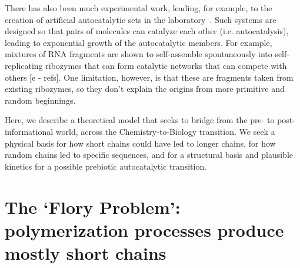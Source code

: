 \documentclass[5p,times]{elsarticle}
\begin{document}
 There has also been much experimental work, leading, for example, to the creation of artificial 
autocatalytic sets in the laboratory~\cite{VonKiedrowski1986,Lincoln2009,Vaidya2012}. Such systems 
are designed so that pairs of molecules can catalyze each other (i.e. autocatalysis), leading to 
exponential growth of the autocatalytic members.  For example, mixtures of RNA fragments are shown 
to self-assemble spontaneously into self-replicating ribozymes that can form catalytic networks 
that can compete with others [e - refs].  One limitation, however, is that these are fragments 
taken 
from existing ribozymes, so they don't explain the origins from more primitive and random 
beginnings.
 
  Here, we describe a theoretical model that seeks to bridge from the pre- to post-informational 
world, across the Chemistry-to-Biology transition.  We seek a physical basis for how short chains 
could have led to longer chains, for how random chains led to specific sequences, and for a 
structural basis and plausible kinetics for a possible prebiotic autocatalytic transition.
   
 \section{The `Flory Problem': polymerization processes produce mostly short chains}
 \label{sec:flory} 
\end{document}
